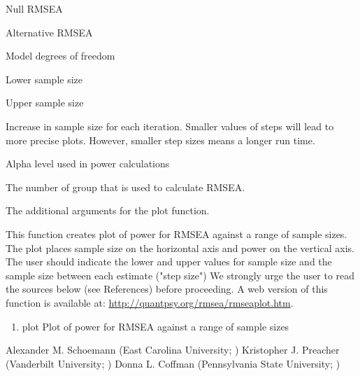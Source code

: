 \documentclass[a4paper]{book}
\begin{document}
%
\begin{Arguments}
\begin{ldescription}
\item[\code{rmsea0}] Null RMSEA
\item[\code{rmseaA}] Alternative RMSEA
\item[\code{df}] Model degrees of freedom
\item[\code{nlow}] Lower sample size
\item[\code{nhigh}] Upper sample size
\item[\code{steps}] Increase in sample size for each iteration. Smaller values of steps will lead to more precise plots. However, smaller step sizes means a longer run time.
\item[\code{alpha}] Alpha level used in power calculations
\item[\code{group}] The number of group that is used to calculate RMSEA.
\item[\code{...}] The additional arguments for the plot function.

\end{ldescription}
\end{Arguments}
%
\begin{Details}\relax
This function creates plot of power for RMSEA against a range of sample sizes. The plot places sample size on the horizontal axis and power on the vertical axis. The user should indicate the lower and upper values for sample size and the sample size between each estimate ("step size") We strongly urge the user to read the sources below (see References) before proceeding.  A web version of this function is available at: \url{http://quantpsy.org/rmsea/rmseaplot.htm}.
\end{Details}
%
\begin{Value}
\begin{enumerate}

\item plot Plot of power for RMSEA against a range of sample sizes

\end{enumerate}

\end{Value}
%
\begin{Author}\relax
Alexander M. Schoemann (East Carolina University; )
Kristopher J. Preacher (Vanderbilt University; )
Donna L. Coffman (Pennsylvania State University; )
\end{Author}
%
\end{document}
